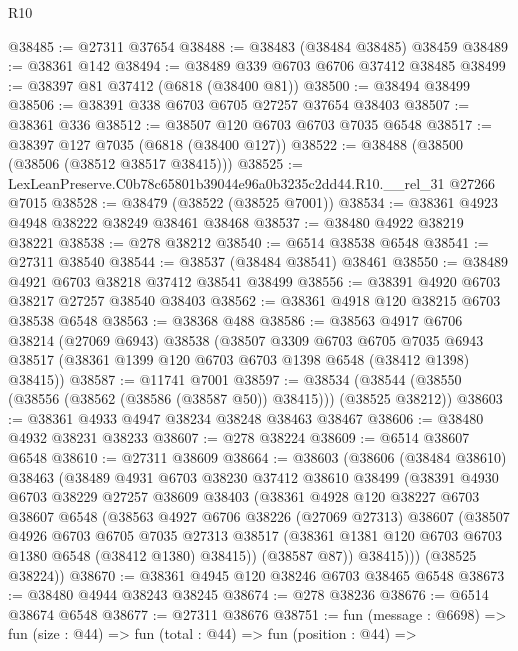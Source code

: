 \begin{lexlean}{R10}
\begin{coremodule}
@38485 := @27311 @37654
@38488 := @38483 (@38484 @38485) @38459
@38489 := @38361 @142
@38494 := @38489 @339 @6703 @6706 @37412 @38485
@38499 := @38397 @81 @37412 (@6818 (@38400 @81))
@38500 := @38494 @38499
@38506 := @38391 @338 @6703 @6705 @27257 @37654 @38403
@38507 := @38361 @336
@38512 := @38507 @120 @6703 @6703 @7035 @6548
@38517 := @38397 @127 @7035 (@6818 (@38400 @127))
@38522 := @38488 (@38500 (@38506 (@38512 @38517 @38415)))
@38525 := LexLeanPreserve.C0b78c65801b39044e96a0b3235c2dd44.R10.__rel_31 @27266 @7015
@38528 := @38479 (@38522 (@38525 @7001))
@38534 := @38361 @4923 @4948 @38222 @38249 @38461 @38468
@38537 := @38480 @4922 @38219 @38221
@38538 := @278 @38212
@38540 := @6514 @38538 @6548
@38541 := @27311 @38540
@38544 := @38537 (@38484 @38541) @38461
@38550 := @38489 @4921 @6703 @38218 @37412 @38541 @38499
@38556 := @38391 @4920 @6703 @38217 @27257 @38540 @38403
@38562 := @38361 @4918 @120 @38215 @6703 @38538 @6548
@38563 := @38368 @488
@38586 := @38563
    @4917
    @6706
    @38214
    (@27069 @6943)
    @38538
    (@38507
      @3309
      @6703
      @6705
      @7035
      @6943
      @38517
      (@38361 @1399 @120 @6703 @6703 @1398 @6548 (@38412 @1398) @38415))
@38587 := @11741 @7001
@38597 := @38534 (@38544 (@38550 (@38556 (@38562 (@38586 (@38587 @50)) @38415))) (@38525 @38212))
@38603 := @38361 @4933 @4947 @38234 @38248 @38463 @38467
@38606 := @38480 @4932 @38231 @38233
@38607 := @278 @38224
@38609 := @6514 @38607 @6548
@38610 := @27311 @38609
@38664 := @38603
    (@38606
      (@38484 @38610)
      @38463
      (@38489
        @4931
        @6703
        @38230
        @37412
        @38610
        @38499
        (@38391
          @4930
          @6703
          @38229
          @27257
          @38609
          @38403
          (@38361
            @4928
            @120
            @38227
            @6703
            @38607
            @6548
            (@38563
              @4927
              @6706
              @38226
              (@27069 @27313)
              @38607
              (@38507
                @4926
                @6703
                @6705
                @7035
                @27313
                @38517
                (@38361 @1381 @120 @6703 @6703 @1380 @6548 (@38412 @1380) @38415))
              (@38587 @87))
            @38415)))
      (@38525 @38224))
@38670 := @38361 @4945 @120 @38246 @6703 @38465 @6548
@38673 := @38480 @4944 @38243 @38245
@38674 := @278 @38236
@38676 := @6514 @38674 @6548
@38677 := @27311 @38676
@38751 := fun (message : @6698) =>
  fun (size : @44) =>
  fun (total : @44) =>
  fun (position : @44) =>

\end{coremodule}
\end{lexlean}
